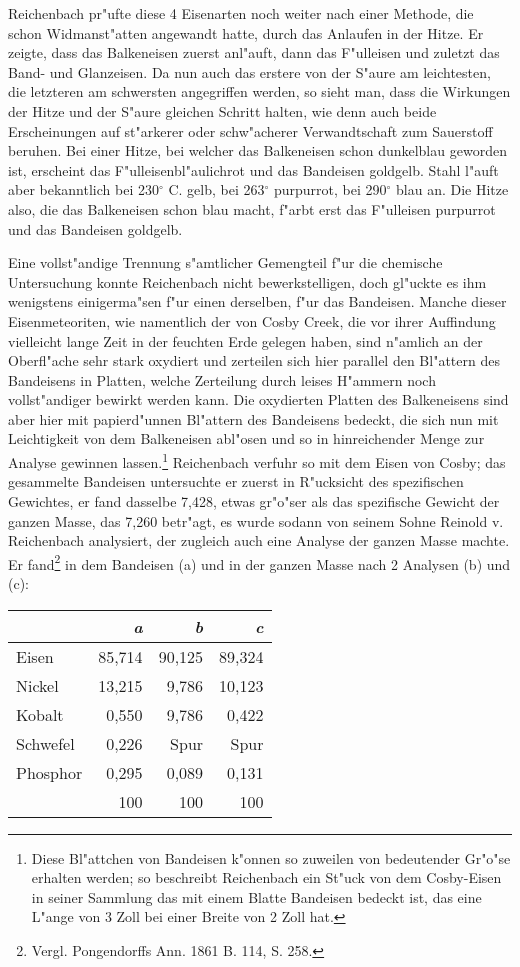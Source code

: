 \documentclass[a4paper, 11pt, oneside]{article}
\begin{document}
Reichenbach pr"ufte diese 4 Eisenarten noch weiter nach einer Methode, die schon Widmanst"atten angewandt hatte, durch das Anlaufen in der Hitze. Er zeigte, dass das Balkeneisen zuerst anl"auft, dann das F"ulleisen und zuletzt das Band- und Glanzeisen. Da nun auch das erstere von der S"aure am leichtesten, die letzteren am schwersten angegriffen werden, so sieht man, dass die Wirkungen der Hitze und der S"aure gleichen Schritt halten, wie denn auch beide Erscheinungen auf st"arkerer oder schw"acherer Verwandtschaft zum Sauerstoff beruhen. Bei einer Hitze, bei welcher das Balkeneisen schon dunkelblau geworden ist, erscheint das F"ulleisenbl"aulichrot und das Bandeisen goldgelb. Stahl l"auft aber bekanntlich bei 230$^{\circ}$ C. gelb, bei 263$^{\circ}$ purpurrot, bei 290$^{\circ}$ blau an. Die Hitze also, die das Balkeneisen schon blau macht, f"arbt erst das F"ulleisen purpurrot und das Bandeisen goldgelb.

Eine vollst"andige Trennung s"amtlicher Gemengteil f"ur die chemische Untersuchung konnte Reichenbach nicht bewerkstelligen, doch gl"uckte es ihm wenigstens einigerma"sen f"ur einen derselben, f"ur das Bandeisen. Manche dieser Eisenmeteoriten, wie namentlich der von Cosby Creek, die vor ihrer Auffindung vielleicht lange Zeit in der feuchten Erde gelegen haben, sind n"amlich an der Oberfl"ache sehr stark oxydiert und zerteilen sich hier parallel den Bl"attern des Bandeisens in Platten, welche Zerteilung durch leises H"ammern noch vollst"andiger bewirkt werden kann. Die oxydierten Platten des Balkeneisens sind aber hier mit papierd"unnen Bl"attern des Bandeisens bedeckt, die sich nun mit Leichtigkeit von dem Balkeneisen abl"osen und so in hinreichender Menge zur Analyse gewinnen lassen.\footnote{Diese Bl"attchen von Bandeisen k"onnen so zuweilen von bedeutender Gr"o"se erhalten werden; so beschreibt Reichenbach ein St"uck von dem Cosby-Eisen in seiner Sammlung das mit einem Blatte Bandeisen bedeckt ist, das eine L"ange von 3 Zoll bei einer Breite von 2 Zoll hat.} Reichenbach verfuhr so mit dem Eisen von Cosby; das gesammelte Bandeisen untersuchte er zuerst in R"ucksicht des spezifischen Gewichtes, er fand dasselbe 7,428, etwas gr"o"ser als das spezifische Gewicht der ganzen Masse, das 7,260 betr"agt, es wurde sodann von seinem Sohne Reinold v. Reichenbach analysiert, der zugleich auch eine Analyse der ganzen Masse machte. Er fand\footnote{Vergl. Pongendorffs Ann. 1861 B. 114, S. 258.} in dem Bandeisen (a) und in der ganzen Masse nach 2 Analysen (b) und (c):
\begin{center}
\begin{tabular}{ |l|r|r|r| }
    \hline
     & \emph{a} & \emph{b} & \emph{c}\\
    \hline\hline
    Eisen & 85,714 & 90,125 & 89,324\\\hline
    Nickel & 13,215 & 9,786 & 10,123\\\hline
    Kobalt & 0,550 & 9,786 & 0,422\\\hline
    Schwefel & 0,226 & Spur & Spur\\\hline
    Phosphor & 0,295 & 0,089 & 0,131\\\hline
     & 100 & 100 & 100\\
    \hline
\end{tabular}
\end{center}
\end{document}
